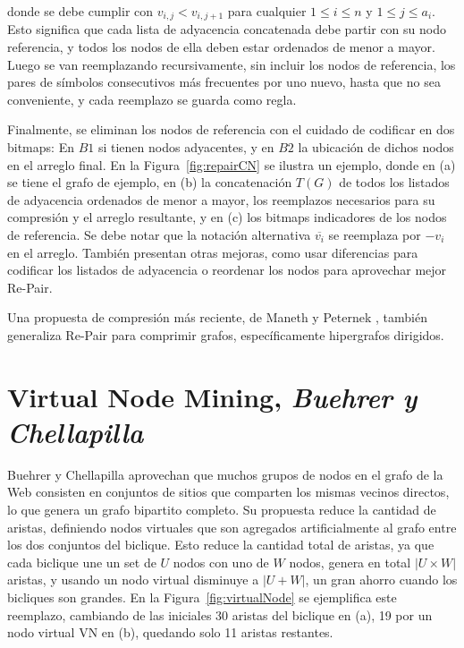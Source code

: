 \noindent donde se debe cumplir con $v_{i,j} < v_{i, j+1}$ para cualquier $1 \leq i \leq n$ y $1 \leq j \leq a_{i}$. Esto significa que cada lista de adyacencia concatenada debe partir con su nodo referencia, y todos los nodos de ella deben estar ordenados de menor a mayor. Luego se van reemplazando recursivamente, sin incluir los nodos de referencia, los pares de símbolos consecutivos más frecuentes por uno nuevo, hasta que no sea conveniente, y cada reemplazo se guarda como regla. 

Finalmente, se eliminan los nodos de referencia con el cuidado de codificar en dos bitmaps: En $B1$ si tienen nodos adyacentes, y en $B2$ la ubicación de dichos nodos en el arreglo final. En la Figura~\ref{fig:repairCN} se ilustra un ejemplo, donde en (a) se tiene el grafo de ejemplo, en (b) la concatenación $T(G)$ de todos los listados de adyacencia ordenados de menor a mayor, los reemplazos necesarios para su compresión y el arreglo resultante, y en (c) los bitmaps indicadores de los nodos de referencia. Se debe notar que la notación alternativa $\overline{v_{i}}$ se reemplaza por $-v_{i}$ en el arreglo. También presentan otras mejoras, como usar diferencias para codificar los listados de adyacencia o reordenar los nodos para aprovechar mejor Re-Pair.



Una propuesta de compresión más reciente, de Maneth y Peternek \cite{maneth2016compressing}, también generaliza Re-Pair para comprimir grafos, específicamente hipergrafos dirigidos.


\section{Virtual Node Mining, \textit{Buehrer y Chellapilla}}
Buehrer y Chellapilla \cite{BuehrerChellapilla} aprovechan que muchos grupos de nodos en el grafo de la Web consisten en conjuntos de sitios que comparten los mismas vecinos directos, lo que genera un grafo bipartito completo. Su propuesta reduce la cantidad de aristas, definiendo nodos virtuales que son agregados artificialmente al grafo entre los dos conjuntos del biclique. Esto reduce la cantidad total de aristas, ya que cada biclique une un set de $U$ nodos con uno de $W$ nodos, genera en total $|U \times W|$ aristas, y usando un nodo virtual disminuye a $|U + W|$, un gran ahorro cuando los bicliques son grandes. En la Figura~\ref{fig:virtualNode} se ejemplifica este reemplazo, cambiando de las iniciales 30 aristas del biclique en (a), 19 por un nodo virtual VN en (b), quedando solo 11 aristas restantes.

